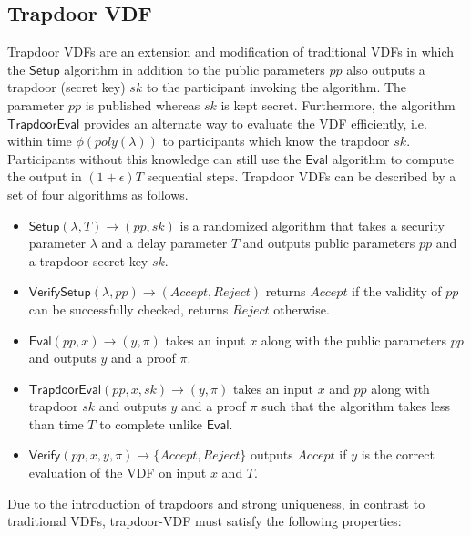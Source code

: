 \documentclass[letterpaper,twocolumn,10pt]{article}
\theoremstyle{definition}
\theoremstyle{remark}
\begin{document}
\subsection{Trapdoor VDF}
\label{appendix:tvdf}
Trapdoor VDFs \cite{wesolowski2019efficient, schindler2021randrunner} are an extension and modification of traditional VDFs in which the $\mathsf{Setup}$ algorithm in addition to the public parameters $pp$ also outputs a trapdoor (secret key) $sk$ to the participant invoking the algorithm. The parameter $pp$ is published whereas $sk$ is kept secret. Furthermore, the algorithm $\mathsf{TrapdoorEval}$ provides an alternate way to evaluate the VDF efficiently, i.e. within time $\phi{(poly{(\lambda)})}$ to participants which know the trapdoor $sk$. Participants without this knowledge can still use the $\mathsf{Eval}$ algorithm to compute the output in $(1+\epsilon)T$ sequential steps.
Trapdoor VDFs can be described by a set of four algorithms as follows.
\begin{itemize}
    \item $\mathsf{Setup}(\lambda, T) \rightarrow (pp, sk)$ is a randomized algorithm that takes a security parameter $\lambda$ and a delay parameter $T$ and outputs public parameters $pp$ and a trapdoor secret key $sk$.
    \item $\mathsf{VerifySetup}(\lambda, pp) \rightarrow (Accept, Reject)$ returns $Accept$ if the validity of $pp$ can be successfully checked, returns $Reject$ otherwise.
    \item $\mathsf{Eval}(pp, x) \rightarrow (y, \pi)$ takes an input $x$ along with the public parameters $pp$ and outputs $y$ and a proof $\pi$.
    \item $\mathsf{TrapdoorEval}(pp,x,sk) \rightarrow (y, \pi)$ takes an input $x$ and $pp$ along with trapdoor $sk$ and outputs $y$ and a proof $\pi$ such that the algorithm takes less than time $T$ to complete unlike $\mathsf{Eval}$.
    \item $\mathsf{Verify}(pp, x, y, \pi) \rightarrow \{Accept, Reject\}$ outputs $Accept$ if $y$ is the correct evaluation of the VDF on input $x$ and $T$.
\end{itemize}

Due to the introduction of trapdoors and strong uniqueness, in contrast to traditional VDFs, trapdoor-VDF must satisfy the following properties:
\end{document}

